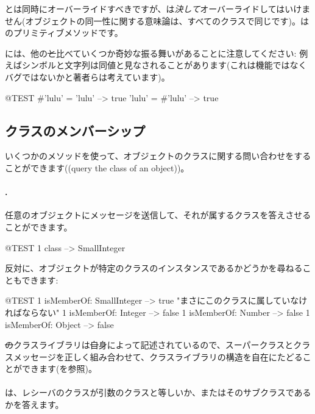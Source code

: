 \documentclass[a4paper,10pt,twoside]{book}
\begin{document}
\ct{=}とは同時にオーバーライドすべきですが、\ct{==}は\emph{決して}オーバーライドしてはいけません(オブジェクトの同一性に関する意味論は、すべてのクラスで同じです)。\ct{==}はのプリミティブメソッドです。

\pharo には、他の\st と比べていくつか奇妙な振る舞いがあることに注意してください: 例えばシンボルと文字列は同値と見なされることがあります(これは機能ではなくバグではないかと著者らは考えています)。

\begin{code}{@TEST}
#'lulu' = 'lulu' --> true
'lulu' = #'lulu' --> true
\end{code}


\subsection{クラスのメンバーシップ}
いくつかのメソッドを使って、オブジェクトのクラスに関する問い合わせをすることができます((query the class of an object))。

\paragraph{.} 任意のオブジェクトにメッセージを送信して、それが属するクラスを答えさせることができます。
\begin{code}{@TEST}
1 class --> SmallInteger
\end{code}

反対に、オブジェクトが特定のクラスのインスタンスであるかどうかを尋ねることもできます:
\begin{code}{@TEST}
1 isMemberOf: SmallInteger --> true    "まさにこのクラスに属していなければならない"
1 isMemberOf: Integer          --> false
1 isMemberOf: Number        --> false
1 isMemberOf: Object           --> false
\end{code}

\st のクラスライブラリは\st 自身によって記述されているので、スーパークラスとクラスメッセージを正しく組み合わせて、クラスライブラリの構造を自在にたどることができます(を参照)。

\paragraph{}
は、レシーバのクラスが引数のクラスと等しいか、またはそのサブクラスであるかを答えます。
\end{document}
